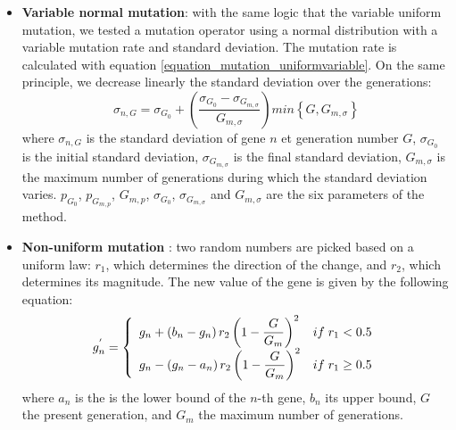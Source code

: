 \documentclass[twocol]{ametsoc}
\begin{document}
\begin{itemize}
	\item \textbf{Variable normal mutation}: with the same logic that the variable uniform mutation, we tested a mutation operator using a normal distribution with a variable mutation rate and standard deviation. The mutation rate is calculated with equation \ref{equation_mutation_uniformvariable}. On the same principle, we decrease linearly the standard deviation over the generations:
	\begin{equation}
	\sigma_{n,G} = \sigma_{G_{0}}+\left( \dfrac{\sigma_{G_{0}}-\sigma_{G_{m,\sigma}}}{G_{m,\sigma}} \right) min\left\lbrace G,G_{m,\sigma}\right\rbrace 
	\label{equation_mutation_normalvariable}
	\end{equation}
	where $\sigma_{n,G}$ is the standard deviation of gene $n$ et generation number $G$, $\sigma_{G_{0}}$ is the initial standard deviation, $\sigma_{G_{m,\sigma}}$ is the final standard deviation, $G_{m,\sigma}$ is the maximum number of generations during which the standard deviation varies. $p_{G_{0}}$, $p_{G_{m,p}}$, $G_{m,p}$, $\sigma_{G_{0}}$, $\sigma_{G_{m,\sigma}}$ and $G_{m,\sigma}$ are the six parameters of the method.
	
	\item \textbf{Non-uniform mutation} \citep{Michalewicz1996}: two random numbers are picked based on a uniform law: $r_{1}$, which determines the direction of the change, and $r_{2}$, which determines its magnitude. The new value of the gene is given by the following equation:
	\begin{equation}
	g_{n}^{'} = 
	\left\lbrace \begin{array}{l l} 
	g_{n} + \left(b_{n}-g_{n}\right) r_{2} \left(1 - \dfrac{G}{G_{m}} \right)^{2} & if \; r_{1} < 0.5 \\
	g_{n} - \left(g_{n}-a_{n}\right) r_{2} \left(1 - \dfrac{G}{G_{m}} \right)^{2} & if \; r_{1} \geq 0.5 \\
	\end{array} \right.
	\label{equation_mutation_nonuniform_original}
	\end{equation}
	where $a_{n}$ is the is the lower bound of the $n$-th gene, $b_{n}$ its upper bound, $G$ the present generation, and $G_{m}$ the maximum number of generations.
	

\end{itemize}
\end{document}
